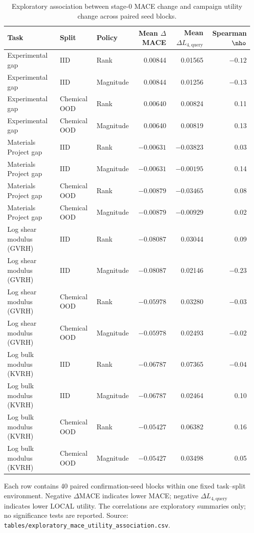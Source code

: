 \documentclass[11pt]{article}
\begin{document}
\begin{table}[!ht]
\centering
\caption{Exploratory association between stage-0 MACE change and campaign utility change across paired seed blocks.}
\label{tab:mace_utility_association}
\scriptsize
\begin{tabularx}{\linewidth}{>{\naggedright\arraybackslash}Xllrrr}
\toprule
Task & Split & Policy & Mean $\Delta$MACE & Mean $\Delta L_{4,\mathrm{query}}$ & Spearman $\nho$\\
\midrule
Experimental gap & IID & Rank & 0.00844 & 0.01565 & $-0.12$\\
Experimental gap & IID & Magnitude & 0.00844 & 0.01256 & $-0.13$\\
Experimental gap & Chemical OOD & Rank & 0.00640 & 0.00824 & 0.11\\
Experimental gap & Chemical OOD & Magnitude & 0.00640 & 0.00819 & 0.13\\
Materials Project gap & IID & Rank & $-0.00631$ & $-0.03823$ & 0.03\\
Materials Project gap & IID & Magnitude & $-0.00631$ & $-0.00195$ & 0.14\\
Materials Project gap & Chemical OOD & Rank & $-0.00879$ & $-0.03465$ & 0.08\\
Materials Project gap & Chemical OOD & Magnitude & $-0.00879$ & $-0.00929$ & 0.02\\
Log shear modulus (GVRH) & IID & Rank & $-0.08087$ & 0.03044 & 0.09\\
Log shear modulus (GVRH) & IID & Magnitude & $-0.08087$ & 0.02146 & $-0.23$\\
Log shear modulus (GVRH) & Chemical OOD & Rank & $-0.05978$ & 0.03280 & $-0.03$\\
Log shear modulus (GVRH) & Chemical OOD & Magnitude & $-0.05978$ & 0.02493 & $-0.02$\\
Log bulk modulus (KVRH) & IID & Rank & $-0.06787$ & 0.07365 & $-0.04$\\
Log bulk modulus (KVRH) & IID & Magnitude & $-0.06787$ & 0.02464 & 0.10\\
Log bulk modulus (KVRH) & Chemical OOD & Rank & $-0.05427$ & 0.06382 & 0.16\\
Log bulk modulus (KVRH) & Chemical OOD & Magnitude & $-0.05427$ & 0.03498 & 0.05\\
\bottomrule
\end{tabularx}
\begin{flushleft}\footnotesize Each row contains 40 paired confirmation-seed blocks within one fixed task--split environment. Negative $\Delta$MACE indicates lower MACE; negative $\Delta L_{4,\mathrm{query}}$ indicates lower LOCAL utility. The correlations are exploratory summaries only; no significance tests are reported. Source: \texttt{tables/exploratory\_mace\_utility\_association.csv}.\end{flushleft}
\end{table}
\end{document}
